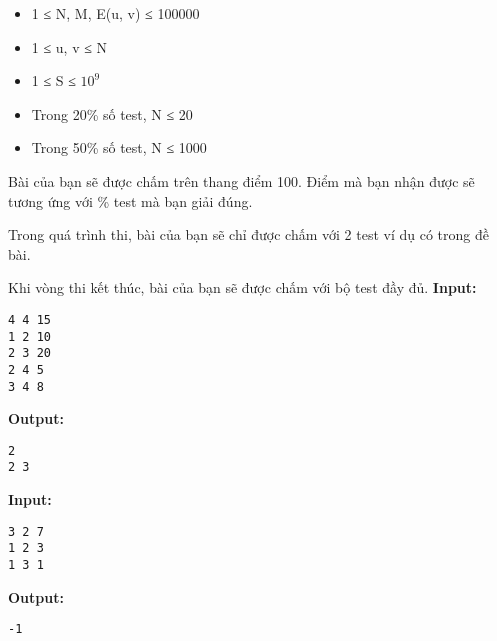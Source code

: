 \begin{itemize}
	\item 1 ≤ N, M, E(u, v) ≤ 100000
	\item 1 ≤ u, v ≤ N
	\item 1 ≤ S ≤ $10^{9}$
	\item Trong 20\% số test, N ≤ 20
	\item Trong 50\% số test, N ≤ 1000
\end{itemize}
Bài của bạn sẽ được chấm trên thang điểm 100. Điểm mà bạn nhận được sẽ tương ứng với \% test mà bạn giải đúng.

Trong quá trình thi, bài của bạn sẽ chỉ được chấm với 2 test ví dụ có trong đề bài.

Khi vòng thi kết thúc, bài của bạn sẽ được chấm với bộ test đầy đủ.
\textbf{Input: }
\begin{verbatim}
4 4 15
1 2 10
2 3 20
2 4 5
3 4 8
\end{verbatim}

\textbf{Output: }
\begin{verbatim}
2
2 3 
\end{verbatim}

\textbf{Input: }
\begin{verbatim}
3 2 7
1 2 3
1 3 1
\end{verbatim}

\textbf{Output: }
\begin{verbatim}
-1 \end{verbatim}